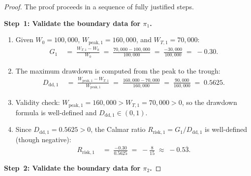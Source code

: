 \documentclass[12pt,openany]{book}
\numberwithin{equation}{chapter}
\theoremstyle{plain}
\theoremstyle{definition}
\theoremstyle{remark}
\numberwithin{equation}{chapter}
\theoremstyle{plain}
\begin{document}
\begin{proof}
The proof proceeds in a sequence of fully justified steps.

\medskip
\noindent\textbf{Step~1: Validate the boundary data for $\pi_1$.}

\begin{enumerate}
  \item Given $W_0 = 100{,}000$, $W_{\mathrm{peak},1} = 160{,}000$,
        and $W_{T,1} = 70{,}000$:
        \begin{align}
          G_1
          &\;=\; \frac{W_{T,1} - W_0}{W_0}
           \;=\; \frac{70{,}000 - 100{,}000}{100{,}000}
           \;=\; \frac{-30{,}000}{100{,}000}
           \;=\; -0.30.
        \end{align}
  \item The maximum drawdown is computed from the peak to the trough:
        \begin{align}
          D_{\mathrm{dd},1}
          &\;=\; \frac{W_{\mathrm{peak},1} - W_{T,1}}{W_{\mathrm{peak},1}}
           \;=\; \frac{160{,}000 - 70{,}000}{160{,}000}
           \;=\; \frac{90{,}000}{160{,}000}
           \;=\; 0.5625.
        \end{align}
  \item Validity check: $W_{\mathrm{peak},1} = 160{,}000 > W_{T,1}
        = 70{,}000 > 0$, so the drawdown formula is well-defined and
        $D_{\mathrm{dd},1} \in (0,1)$. \checkmark
  \item Since $D_{\mathrm{dd},1} = 0.5625 > 0$, the Calmar ratio
        $R_{\mathrm{risk},1} = G_1 / D_{\mathrm{dd},1}$ is well-defined
        (though negative):
        \begin{align}
          R_{\mathrm{risk},1}
          &\;=\; \frac{-0.30}{0.5625}
           \;=\; -\frac{8}{15}
           \;\approx\; -0.5\overline{3}.
        \end{align}
\end{enumerate}

\medskip
\noindent\textbf{Step~2: Validate the boundary data for $\pi_2$.}


\end{proof}
\end{document}
